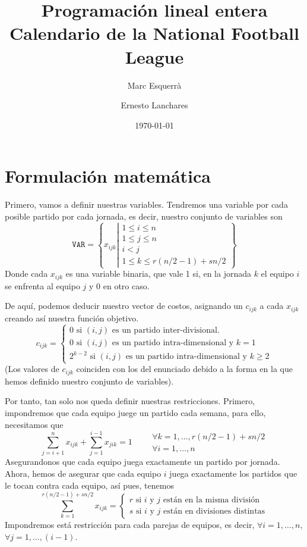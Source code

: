 \documentclass[12pt,a4paper,table]{article}
\newcommand\setb[1]{\left\{#1\right\}}
\theoremstyle{break}
\begin{document}
\date{\today}

\title{\textbf{Programación lineal entera} \\
\small{Calendario de la National Football League}}
\author{Marc Esquerrà \and Ernesto Lanchares}
\maketitle

\tableofcontents
\newpage
\section{Formulación matemática}

Primero, vamos a definir nuestras variables. Tendremos una variable por cada posible
partido por cada jornada, es decir, nuestro conjunto de variables son
\[
	\texttt{VAR} = \setb{x_{ijk} \left\vert \substack{1 \leq i \leq n \\
		1 \leq j \leq n \\ i < j \\ 1 \leq k \leq r(n/2- 1) +
		sn/2}\right.}
\]
Donde cada $x_{ijk}$ es una variable binaria, que vale 1 si, en la jornada $k$ el
equipo $i$ se enfrenta al equipo $j$ y 0 en otro caso.

De aquí, podemos deducir nuestro vector de costos, asignando un $c_{ijk}$ a cada
$x_{ijk}$ creando así nuestra función objetivo.
\[
	c_{ijk} =
	\begin{cases}
		0 \text{ si $(i,j)$ es un partido inter-divisional.} \\
		0 \text{ si $(i,j)$ es un partido intra-dimensional y $k=1$} \\
		2^{k-2} \text{ si $(i,j)$ es un partido intra-dimensional y $k \geq 2$}
	\end{cases}
\]
(Los valores de $c_{ijk}$ coinciden con los del enunciado debido a la forma en la que
hemos definido nuestro conjunto de variables).

Por tanto, tan solo nos queda definir nuestras restricciones. Primero, impondremos
que cada equipo juege un partido cada semana, para ello, necesitamos que
\[
	\sum^n_{j = i+1} x_{ijk} +
	\sum^{i-1}_{j = 1} x_{jik} = 1 \qquad
	\substack{\forall k=1,\dots,r(n/2-1)+sn/2 \\ \forall i = 1,\dots,n}
\]
Asegurandonos que cada equipo juega exactamente un partido por jornada. Ahora, hemos de
asegurar que cada equipo $i$ juega exactamente los partidos que le tocan contra cada
equipo, así pues, tenemos
\[
	\sum^{r(n/2 - 1) + sn/2}_{k=1} x_{ijk} =
	\begin{cases}
		r \text{ si $i$ y $j$ están en la misma división} \\
		s \text{ si $i$ y $j$ están en divisiones distintas}
	\end{cases}
\]
Impondremos está restricción para cada parejas de equipos, es decir, $\forall i =
1,\dots,n$, $\forall j = 1, \dots, (i-1)$.
\end{document}
